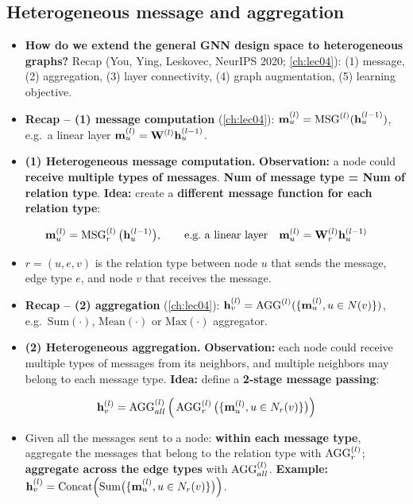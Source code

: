 \subsection{Heterogeneous message and aggregation}\label{sec:lec09-msgagg}

\begin{itemize}
  \item \textbf{How do we extend the general GNN design space to heterogeneous
    graphs?} Recap (You, Ying, Leskovec, NeurIPS 2020; \cref{ch:lec04}): (1)
    message, (2) aggregation, (3) layer connectivity, (4) graph augmentation,
    (5) learning objective.
  \item \textbf{Recap -- (1) message computation} (\cref{ch:lec04}):
    $\mathbf{m}_u^{(l)}=\operatorname{MSG}^{(l)}(\mathbf{h}_u^{(l-1)})$, e.g.\ a linear layer
    $\mathbf{m}_u^{(l)}=\mathbf{W}^{(l)}\mathbf{h}_u^{(l-1)}$.
  \item \textbf{(1) Heterogeneous message computation.}
    \textbf{Observation:} a node could \textbf{receive multiple types of
    messages}. \textbf{Num of message type = Num of relation type}.
    \textbf{Idea:} create a \textbf{different message function for each relation
    type}:
\end{itemize}
\begin{equation}\label{eq:lec09-hmsg}
  \mathbf{m}_u^{(l)} = \operatorname{MSG}_r^{(l)}\big(\mathbf{h}_u^{(l-1)}\big),
  \qquad\text{e.g.\ a linear layer}\quad
  \mathbf{m}_u^{(l)} = \mathbf{W}_r^{(l)}\mathbf{h}_u^{(l-1)}
\end{equation}
\begin{itemize}
  \item[] $r=(u,e,v)$ is the relation type between node $u$ that sends the
    message, edge type $e$, and node $v$ that receives the message.
  \item \textbf{Recap -- (2) aggregation} (\cref{ch:lec04}):
    $\mathbf{h}_v^{(l)}=\operatorname{AGG}^{(l)}(\{\mathbf{m}_u^{(l)},u\in N(v)\})$, e.g.\ $\mathrm{Sum}(\cdot)$,
    $\mathrm{Mean}(\cdot)$ or $\mathrm{Max}(\cdot)$ aggregator.
  \item \textbf{(2) Heterogeneous aggregation.} \textbf{Observation:} each node
    could receive multiple types of messages from its neighbors, and multiple
    neighbors may belong to each message type. \textbf{Idea:} define a
    \textbf{2-stage message passing}:
\end{itemize}
\begin{equation}\label{eq:lec09-hagg}
  \mathbf{h}_v^{(l)} = \operatorname{AGG}_{all}^{(l)}\Big(\operatorname{AGG}_r^{(l)}\big(\{\mathbf{m}_u^{(l)}, u\in N_r(v)\}\big)\Big)
\end{equation}
\begin{itemize}
  \item[] Given all the messages sent to a node: \textbf{within each message
    type}, aggregate the messages that belong to the relation type with
    $\operatorname{AGG}_r^{(l)}$; \textbf{aggregate across the edge types} with
    $\operatorname{AGG}_{all}^{(l)}$. \textbf{Example:}
    $\mathbf{h}_v^{(l)}=\mathrm{Concat}\Big(\mathrm{Sum}\big(\{\mathbf{m}_u^{(l)}, u\in N_r(v)\}\big)\Big)$.
\end{itemize}

